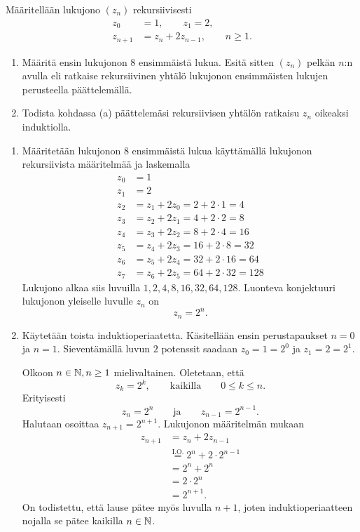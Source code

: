 \documentclass[12pt,a4paper]{article}
\begin{document}
\begin{exercise}
Määritellään lukujono \(\left(z_n\right)\) rekursiivisesti
\begin{align*}
z_0 &= 1, \qquad z_1 = 2, \\
z_{n+1} &= z_n + 2z_{n-1}, \qquad n \geq 1.
\end{align*}

\begin{enumerate}[label=\alph*), nosep]
\item Määritä ensin lukujonon 8 ensimmäistä lukua. Esitä sitten
\(\left(z_n\right)\)
pelkän \(n\):n avulla eli ratkaise rekursiivinen yhtälö lukujonon
ensimmäisten lukujen perusteella päättelemällä.
\item Todista kohdassa (a) päättelemäsi rekursiivisen yhtälön ratkaisu
\(z_n\) oikeaksi induktiolla.
\end{enumerate}
\end{exercise}

\begin{solution}
\leavevmode\par
\begin{enumerate}[label=\alph*), nosep]
\item Määritetään lukujonon 8 ensimmäistä lukua käyttämällä lukujonon
rekursiivista määritelmää ja laskemalla
\begin{align*}
z_0 &= 1 \\
z_1 &= 2 \\
z_2 &= z_1 + 2z_0 = 2 + 2\cdot 1 = 4 \\
z_3 &= z_2 + 2z_1 = 4 + 2\cdot 2 = 8 \\
z_4 &= z_3 + 2z_2 = 8 + 2\cdot 4 = 16 \\
z_5 &= z_4 + 2z_3 = 16 + 2\cdot 8 = 32 \\
z_6 &= z_5 + 2z_4 = 32 + 2\cdot 16 = 64 \\
z_7 &= z_6 + 2z_5 = 64 + 2\cdot 32 = 128
\end{align*}
Lukujono alkaa siis luvuilla \(1, 2, 4, 8, 16, 32, 64, 128\). Luonteva
konjektuuri lukujonon yleiselle luvulle \(z_n\) on
\[z_n = 2^n.\]
\item Käytetään toista induktioperiaatetta. Käsitellään ensin perustapaukset
\(n = 0\) ja \(n = 1\). Sieventämällä luvun \(2\) potenssit saadaan
\(z_0 = 1 = 2^0\) ja
\(z_1 = 2 = 2^1\).

Olkoon \(n \in \mathbb{N}, n \geq 1\) mielivaltainen. Oletetaan, että
\[z_k = 2^k, \qquad \text{kaikilla} \qquad 0 \leq k \leq n.\]
Erityisesti
\[z_n = 2^n \qquad \text{ja} \qquad z_{n-1} = 2^{n-1}.\]
Halutaan osoittaa \(z_{n+1} = 2^{n+1}\). Lukujonon määritelmän mukaan
\begin{align*}
z_{n+1} &= z_n + 2z_{n-1} \\
&\overset{\text{I.O.}}{=} 2^n + 2\cdot 2^{n-1} \\
&= 2^n + 2^n \\
&= 2\cdot 2^n \\
&= 2^{n+1}.
\end{align*}
On todistettu, että lause pätee myös luvulla \(n + 1\), joten
induktioperiaatteen
nojalla se pätee kaikilla \(n \in \mathbb{N}\).
\end{enumerate}
\end{solution}
\end{document}
